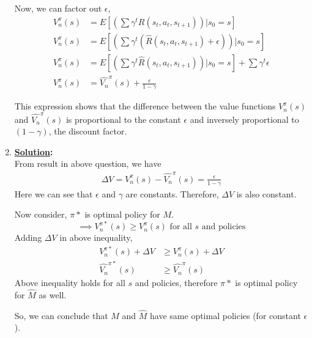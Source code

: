 \documentclass[12pt]{article}
\newcommand{\solution}{\noindent \textbf{\underline{Solution}: }}
\begin{document}
\begin{enumerate}
    Now, we can factor out $\epsilon$, \\
    \begin{align*}
        V_n ^\pi(s) &= E\left[ \left(\sum \gamma^t R(s_t, a_t, s_{t+1})\right) | s_0 = s \right] \\
        V_n ^\pi(s) &= E\left[ \left(\sum \gamma^t (\hat{R}(s_t, a_t, s_{t+1}) + \epsilon)\right) | s_0 = s \right] \\
        V_n ^\pi(s) &= E\left[ \left(\sum \gamma^t \hat{R}(s_t, a_t, s_{t+1})\right) | s_0 = s \right] + \sum \gamma^t \epsilon \\
        V_n ^\pi(s) &= \hat{V_n} ^\pi(s) + \frac{\epsilon}{1 - \gamma}
    \end{align*}

    This expression shows that the difference between the value functions $V_n ^\pi(s)$ and $\hat{V_n} ^\pi(s)$ is proportional to the constant $\epsilon$ and inversely proportional to $ (1 - \gamma)$, the discount factor.

    \item \solution \\
    From result in above question, we have 
    \begin{align*}
        \Delta V = V_n ^\pi(s) - \hat{V_n} ^\pi(s) = \frac{\epsilon}{1 - \gamma}
    \end{align*}
    Here we can see that $\epsilon$ and $\gamma$ are constants. Therefore, $\Delta V$ is also constant.

    Now consider, $\pi*$ is optimal policy for $M$. 
    \begin{equation*}
        \implies V_n ^{\pi*}(s) \geq V_n ^\pi(s) \text{  for all $s$ and policies}
    \end{equation*}
    Adding $\Delta V$ in above inequality, 
    \begin{align*}
        V_n ^{\pi*}(s) + \Delta V &\geq V_n ^\pi(s) + \Delta V \\
        \hat{V_n} ^{\pi*}(s) &\geq \hat{V_n} ^\pi(s)
    \end{align*}
    Above inequality holds for all $s$ and policies, therefore $\pi*$ is optimal policy for $\hat{M}$ as well.

    So, we can conclude that $M$ and $\hat{M}$ have same optimal policies (for constant $\epsilon$).


\end{enumerate}
\end{document}
